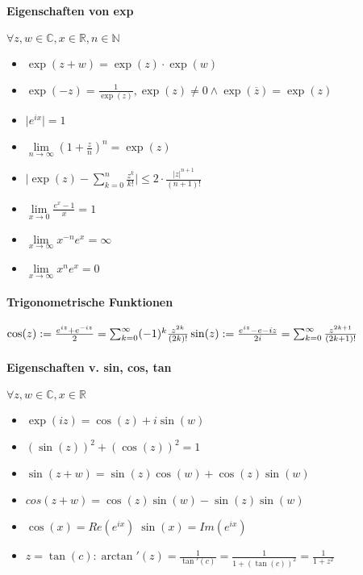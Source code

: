 \documentclass[paper=a4,paper=landscape, fontsize=6pt,DIV=25, twoside]{scrartcl}
\newcommand{\real}{{\mathbb{R}}}
\newcommand{\compl}{\mathbb{C}}
\newcommand{\nat}{\mathbb{N}}
\begin{document}
\begin{multicols*}{4}
		\paragraph{Eigenschaften von exp}
		$\forall z,w \in \compl, x \in \real, n \in \nat$
		\begin{itemize}[noitemsep,nolistsep]
			\item $\exp(z+w)=\exp(z)\cdot \exp(w)$
			\item $\exp(-z)=\frac{1}{\exp(z)}, \exp(z) \neq 0 \wedge \exp(\overline{z})=\exp(z)$
			\item $\lvert e^{ix} \rvert = 1$
			\item $\lim\limits_{n \rightarrow \infty} (1+\frac{z}{n})^n=\exp(z)$
			\item $ \lvert \exp(z)- \sum_{k=0}^{n} \frac{z^k}{k!} \rvert \leq 2 \cdot \frac{\lvert z \rvert ^{n+1}}{(n+1)!}$
			\item $ \lim\limits_{x \rightarrow 0} \frac{e^x-1}{x} = 1$
			\item $ \lim\limits_{x \rightarrow \infty} x^{-n}e^x=\infty$
			\item $ \lim\limits_{x \rightarrow \infty} x^ne^x=0$
		\end{itemize}
			\paragraph{Trigonometrische Funktionen}
			$  \cos(z):=\frac{e^{iz}+e^{-iz}}{2} = \sum_{k=0}^{\infty} (-1)^k\frac{z^{2k}}{(2k)!}\\\sin(z):=\frac{e^{iz}-e{-iz}}{2i} = \sum_{k=0}^{\infty}\frac{z^{2k+1}}{(2k+1)!}$
			\paragraph{Eigenschaften v. sin, cos, tan}
			$\forall z,w \in \compl, x \in \real$
			
			\begin{itemize}[noitemsep,nolistsep]
				\item $\exp(iz) = \cos(z)+i\sin(w)$
				\item $(\sin(z))^2+(\cos(z))^2=1$
				\item $\sin(z+w)=\sin(z)\cos(w)+\cos(z)\sin(w)$
				\item $cos(z+w)=\cos(z)\sin(w)-\sin(z)\sin(w)$
				\item $\cos(x)=Re(e^{ix}) \; \sin(x)=Im(e^{ix})$
				\item $z=\tan(c): \arctan'(z)=\frac{1}{\tan'(c)}=\frac{1}{1+(\tan(c))^2}=\frac{1}{1+z^2}$
			\end{itemize}
		

\end{multicols*}
\end{document}
